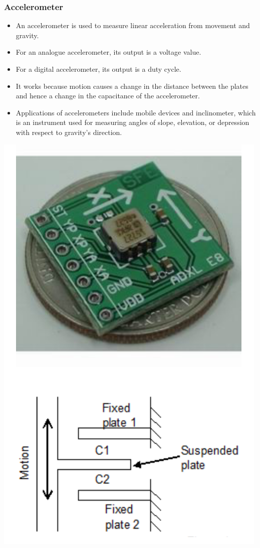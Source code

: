 \documentclass[11pt]{article}
\begin{document}
\subsubsection{Accelerometer}
\label{sec:org1343aff}
\begin{itemize}
\item An accelerometer is used to measure linear acceleration from movement and gravity.
\item For an analogue accelerometer, its output is a voltage value.
\item For a digital accelerometer, its output is a duty cycle.
\item It works because motion causes a change in the distance between the plates and hence a change in the capacitance of the accelerometer.
\item Applications of accelerometers include mobile devices and inclinometer, which is an instrument used for measuring angles of slope, elevation, or depression with respect to gravity's direction.
\end{itemize}

\begin{center}
\includegraphics[scale=0.9]{./images/accelerometer-diagram.png}
\end{center}
\end{document}
